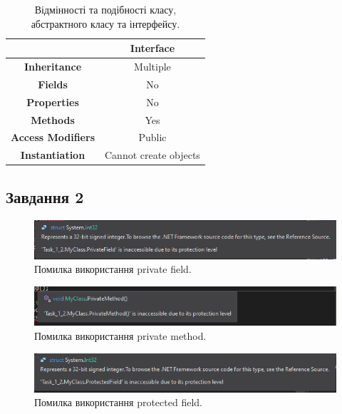 \documentclass[oneside,14pt]{extarticle}
\begin{document}
\begin{normalsize}
	\begin{table}[H]
		\centering
		\begin{tabular}{ |c|c| }
			\hline
			& \textbf{Interface} \\ 
			\hline
			\textbf{Inheritance} & Multiple \\ 
			\hline
			\textbf{Fields} & No \\ 
			\hline
			\textbf{Properties} & No \\ 
			\hline
			\textbf{Methods} & Yes \\ 
			\hline
			\textbf{Access Modifiers} & Public \\ 
			\hline
			\textbf{Instantiation} & Cannot create objects \\ 
			\hline
		\end{tabular}
		\caption{Відмінності та подібності класу, абстрактного класу та інтерфейсу.}
	\end{table}
	
	\subsection*{Завдання 2}
		\begin{figure}[H]
		\centering
		\includegraphics[scale=0.7]{1_2_1}
		\caption{Помилка використання private field.}
	\end{figure}
	
	\begin{figure}[H]
		\centering
		\includegraphics[scale=0.7]{1_2_2}
		\caption{Помилка використання private method.}
	\end{figure}
	
	\begin{figure}[H]
		\centering
		\includegraphics[scale=0.7]{1_2_3}
		\caption{Помилка використання protected field.}
	\end{figure}
	

\end{normalsize}
\end{document}
